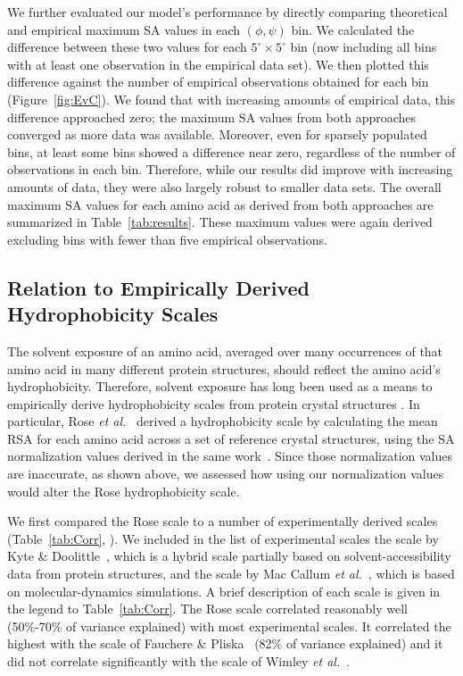 \documentclass[11pt]{article}
\begin{document}
We further evaluated our model's performance by directly comparing theoretical and empirical maximum SA values in each $(\phi, \psi)$ bin. We calculated the difference between these two values for each $5^\circ\times5^\circ$ bin (now including all bins with at least one observation in the empirical data set). We then plotted this difference against the number of empirical observations obtained for each bin (Figure~\ref{fig:EvC}). We found that with increasing amounts of empirical data, this difference approached zero; the maximum SA values from both approaches converged as more data was available. Moreover, even for sparsely populated bins, at least some bins showed a difference near zero, regardless of the number of observations in each bin. Therefore, while our results did improve with increasing amounts of data, they were also largely robust to smaller data sets. The overall maximum SA values for each amino acid as derived from both approaches are summarized in Table~\ref{tab:results}. These maximum values were again derived excluding bins with fewer than five empirical observations.


\subsection*{Relation to Empirically Derived Hydrophobicity Scales}

The solvent exposure of an amino acid, averaged over many occurrences of that amino acid in many different protein structures, should reflect the amino acid's hydrophobicity. Therefore, solvent exposure has long been used as a means to empirically derive hydrophobicity scales from protein crystal structures \cite{Chothia1976,Rose1985}. In particular, Rose \emph{et al.}~\cite{Rose1985} derived a hydrophobicity scale by calculating the mean RSA for each amino acid across a set of reference crystal structures, using the SA normalization values derived in the same work~\cite{Rose1985}. Since those normalization values are inaccurate, as shown above, we assessed how using our normalization values would alter the Rose hydrophobicity scale.

We first compared the Rose scale to a number of experimentally derived scales (Table~\ref{tab:Corr}, \cite{Wolfenden1981,Kyte1981,Fauchere1983,Radzicka1988,MacCallum2007,Moon2011,Wimley1996}). We included in the list of experimental scales the scale by Kyte \& Doolittle~\cite{Kyte1981}, which is a hybrid scale partially based on solvent-accessibility data from protein structures, and the scale by Mac Callum \emph{et al.}~\cite{MacCallum2007}, which is based on molecular-dynamics simulations. A brief description of each scale is given in the legend to Table~\ref{tab:Corr}. The Rose scale correlated reasonably well (50\%-70\% of variance explained) with most experimental scales. It correlated the highest with the scale of Fauchere \& Pliska~\cite{Fauchere1983} (82\% of variance explained) and it did not correlate significantly with the scale of Wimley \emph{et al.}~\cite{Wimley1996}.
\end{document}
